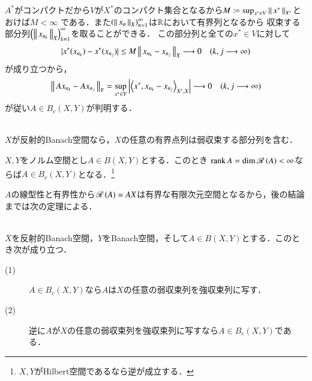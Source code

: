 \begin{prf}
\begin{description}
\begin{description}
						$A^*$がコンパクトだから$V$が$X^*$のコンパクト集合となるから$M \coloneqq \operatorname*{sup}_{x^* \in V} \left\|\, x^*\, \right\|_{X^*}$とおけば$M < \infty$
						である．また$\left(\left\|\, x_n\, \right\|_{X}\right)_{n=1}^{\infty}$は$\mathbb{R}$において有界列となるから
						収束する部分列$\left(\left\|\, x_{n_k}\, \right\|_{X}\right)_{k=1}^{\infty}$を取ることができる．
						この部分列と全ての$x^* \in V$に対して
						\begin{align}
							|x^*(x_{n_k}) - x^*(x_{n_j})| \leq M\left\|\, x_{n_k} - x_{n_j}\, \right\|_{X} \longrightarrow 0 \quad (k,j \longrightarrow \infty)
						\end{align}
						が成り立つから，
						\begin{align}
							\Norm{Ax_{n_k} - Ax_{n_j}}{Y} = \sup{x^* \in V}{\left|\inprod<x^*,x_{n_k} - x_{n_j}>_{X^*,X}\right|} \longrightarrow 0 \quad (k,j \longrightarrow \infty)
						\end{align}
						が従い$A \in B_c(X,Y)$が判明する．
				\end{description}
				\QED
		\end{description}
	\end{prf}
	
	\begin{screen}
		\begin{thm}[反射的Banach空間の弱点列コンパクト性]\mbox{}\\
			$X$が反射的Banach空間なら，$X$の任意の有界点列は弱収束する部分列を含む．
			\label{thm:weak_seq_compact}
		\end{thm}
	\end{screen}
	
	\begin{screen}
		\begin{thm}[有限次元空間における有界点列の収束]
			$X,Y$をノルム空間とし$A \in B(X,Y)$とする．このとき
			$\operatorname{rank} A = \operatorname{dim} \mathscr{R}\left( A \right) < \infty$ならば$A \in B_c(X,Y)$となる．\footnote{$X,Y$がHilbert空間であるなら逆が成立する．}
		\end{thm}
	\end{screen}
	
	\begin{prf}
		$A$の線型性と有界性から$\mathscr{R}\left( A \right) = AX$は有界な有限次元空間となるから，後の結論までは次の定理による．
		\QED
	\end{prf}
	
	
	\begin{screen}
		\begin{thm}[反射的Banach空間上のコンパクト作用素は弱収束列を強収束列に写す]\mbox{}\\
			$X$を反射的Banach空間，$Y$をBanach空間，そして$A \in B(X,Y)$とする．このとき次が成り立つ．
			\begin{description}
				\item[(1)] $A \in B_c(X,Y)$なら$A$は$X$の任意の弱収束列を強収束列に写す．
				\item[(2)] 逆に$A$が$X$の任意の弱収束列を強収束列に写すなら$A \in B_c(X,Y)$である．
			\end{description}
		\end{thm}
	\end{screen}
	
